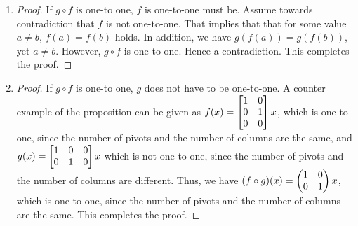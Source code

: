 \documentclass[8pt,twocolumn]{article}
\begin{document}
\begin{Answer}[number=25]
  \begin{enumerate}
    \item \begin{proof}
      If $g\circ f$ is one-to one, $f$ is one-to-one must be. Assume towards
      contradiction that $f$ is not one-to-one. That implies that that for some
      value $a\ne b$, $f(a)=f(b)$ holds. In addition, we have $g(f(a)) =
      g(f(b))$, yet $a\ne b$. However, $g\circ f$ is one-to-one. Hence a
      contradiction. This completes the proof.
    \end{proof}
    \item \begin{proof}
        If $g\circ f$ is one-to one, $g$ does not have to be one-to-one. A
        counter example of the proposition can be given as
        \(f(x) = \begin{bmatrix}
          \imat{2} \\ 0 & 0
        \end{bmatrix}x\), which is one-to-one, since the number of
        pivots and the number of columns are the same, and \(g(x) = \begin{bmatrix}
          \mqty{\imat{2}} & \mqty{0\\0}
        \end{bmatrix}x\) which is not one-to-one, since the number of pivots
        and the number of columns are different. Thus, we have $(f\circ g) (x)
        = \begin{pmatrix}
          \imat{2}
        \end{pmatrix}x$, which is one-to-one, since the number of
        pivots and the number of columns are the same. This completes the
        proof.
    \end{proof}
  \end{enumerate}
\end{Answer}
\end{document}
